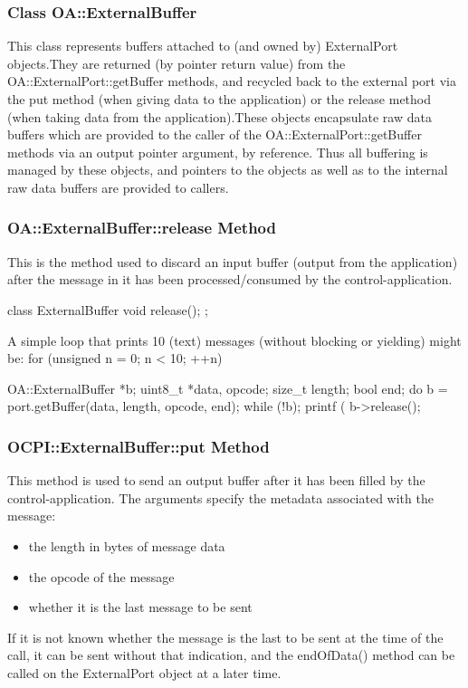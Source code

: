 \documentclass[10pt, a4paper, oneside]{article}
\renewcommand\_{\textunderscore\allowbreak} %
\begin{document}
\subsubsection{Class OA::ExternalBuffer}This class represents buffers attached to (and owned by) ExternalPort objects.They are returned (by pointer return value) from the OA::ExternalPort::getBuffer methods, and recycled back to the external port via the put method (when giving data to the application) or the release method (when taking data from the application).These objects encapsulate raw data buffers which are provided to the caller of the OA::ExternalPort::getBuffer methods via an output pointer argument, by reference.  Thus all buffering is managed by these objects, and pointers to the objects as well as to the internal raw data buffers are provided to callers.
\subsubsection{OA::ExternalBuffer::release Method} This is the method used to discard an input buffer (output from the application) after the message in it has been processed/consumed by the control-application. 
\begin{ocpixml}  
class ExternalBuffer {
    void release();
  };\end{ocpixml} 
A simple loop that prints 10 (text) messages (without blocking or yielding) might be:
for (unsigned n = 0; n < 10; ++n) 
\begin{ocpixml}  
{
    	OA::ExternalBuffer *b;
    	uint8_t *data, opcode;  size_t length;  bool end;
    	do b = port.getBuffer(data, length, opcode, end); while (!b);
   	printf (%
   	b->release();
  }  \end{ocpixml} 
\subsubsection{OCPI::ExternalBuffer::put Method} This method is used to send an output buffer after it has been filled by the control-application.  The arguments specify the metadata associated with the message:\begin{itemize}
\item  the length in bytes of  message data
\item  the opcode of the message
\item  whether it is the last message to be sent
\end{itemize}If it is not known whether the message is the last to be sent at the time of the call, it can be sent without that indication, and the endOfData() method can be called on the ExternalPort object at a later time.\\
\end{document}
